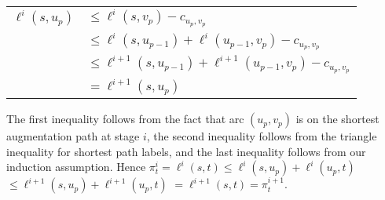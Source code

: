 \begin{tabular}{ll}
$\ell^i(s,u_p)$&$\leq \ell^i(s,v_p) - c_{u_p,v_p}$\\
&$\leq \ell^i(s,u_{p-1}) + \ell^i(u_{p-1},v_p) - c_{u_p,v_p}$\\
&$\leq \ell^{i+1}(s,u_{p-1}) + \ell^{i+1}(u_{p-1},v_p) - c_{u_p,v_p}$\\
&$= \ell^{i+1}(s,u_p)$\\
\end{tabular}

\noindent
The first inequality follows from the fact that arc $(u_p,v_p)$ is on
the shortest augmentation path at stage $i$, the second inequality
follows from the triangle inequality for shortest path labels, and the
last inequality follows from our induction assumption.  Hence $\pi^i_t
= \ell^i(s,t) \leq \ell^i(s,u_p) + \ell^i(u_p,t)$ $\leq
\ell^{i+1}(s,u_p) + \ell^{i+1}(u_p,t)$ $= \ell^{i+1}(s,t)=
\pi^{i+1}_t$.  \bull

\vskip 5pt

